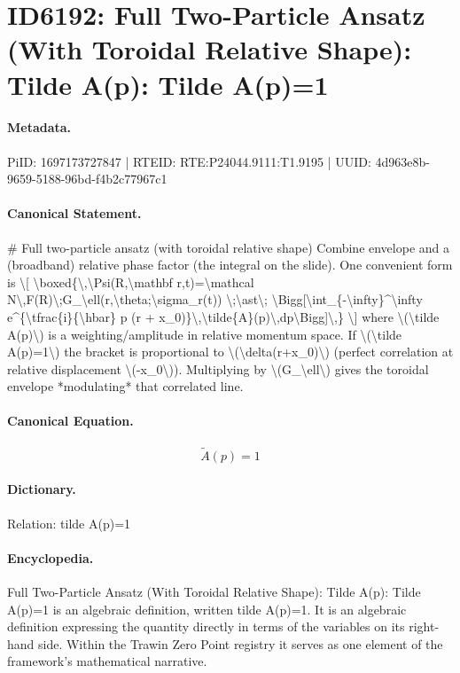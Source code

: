 \section*{ID6192: Full Two-Particle Ansatz (With Toroidal Relative Shape): Tilde A(p): Tilde A(p)=1}
\paragraph{Metadata.}
PiID: 1697173727847 | RTEID: RTE:P24044.9111:T1.9195 | UUID: 4d963e8b-9659-5188-96bd-f4b2c77967c1

\paragraph{Canonical Statement.}
\# Full two-particle ansatz (with toroidal relative shape) Combine envelope and a (broadband) relative phase factor (the integral on the slide). One convenient form is \textbackslash{}[ \textbackslash{}boxed\{\textbackslash{},\textbackslash{}Psi(R,\textbackslash{}mathbf r,t)=\textbackslash{}mathcal N\textbackslash{},F(R)\textbackslash{};G\_\textbackslash{}ell(r,\textbackslash{}theta;\textbackslash{}sigma\_r(t)) \textbackslash{};\textbackslash{}ast\textbackslash{}; \textbackslash{}Bigg[\textbackslash{}int\_\{-\textbackslash{}infty\}\textasciicircum{}\textbackslash{}infty e\textasciicircum{}\{\textbackslash{}tfrac\{i\}\{\textbackslash{}hbar\} p (r + x\_0)\}\textbackslash{},\textbackslash{}tilde\{A\}(p)\textbackslash{},dp\textbackslash{}Bigg]\textbackslash{},\} \textbackslash{}] where \textbackslash{}(\textbackslash{}tilde A(p)\textbackslash{}) is a weighting/amplitude in relative momentum space. If \textbackslash{}(\textbackslash{}tilde A(p)=1\textbackslash{}) the bracket is proportional to \textbackslash{}(\textbackslash{}delta(r+x\_0)\textbackslash{}) (perfect correlation at relative displacement \textbackslash{}(-x\_0\textbackslash{})). Multiplying by \textbackslash{}(G\_\textbackslash{}ell\textbackslash{}) gives the toroidal envelope *modulating* that correlated line.

\paragraph{Canonical Equation.}
\[
\tilde A(p)=1
\]

\paragraph{Dictionary.}
Relation: tilde A(p)=1

\paragraph{Encyclopedia.}
Full Two-Particle Ansatz (With Toroidal Relative Shape): Tilde A(p): Tilde A(p)=1 is an algebraic definition, written tilde A(p)=1. It is an algebraic definition expressing the quantity directly in terms of the variables on its right-hand side. Within the Trawin Zero Point registry it serves as one element of the framework's mathematical narrative.
